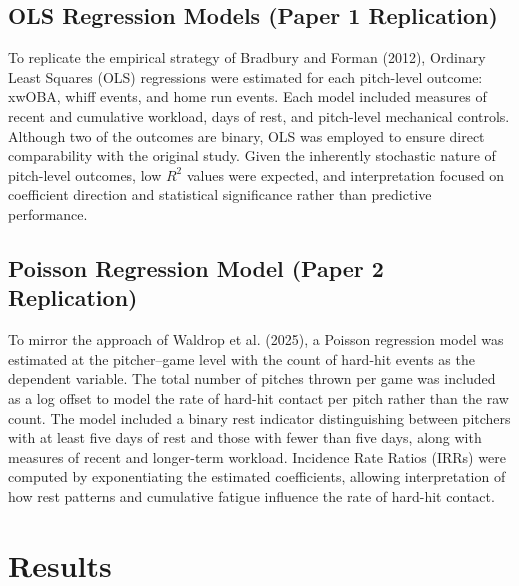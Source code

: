 \documentclass[12pt, letterpaper]{article}
\begin{document}
\subsection{OLS Regression Models (Paper 1 Replication)}

To replicate the empirical strategy of Bradbury and Forman (2012), Ordinary Least Squares (OLS) regressions were estimated for each pitch-level outcome: xwOBA, whiff events, and home run events. Each model included measures of recent and cumulative workload, days of rest, and pitch-level mechanical controls. Although two of the outcomes are binary, OLS was employed to ensure direct comparability with the original study. Given the inherently stochastic nature of pitch-level outcomes, low $R^2$ values were expected, and interpretation focused on coefficient direction and statistical significance rather than predictive performance.

\subsection{Poisson Regression Model (Paper 2 Replication)}

To mirror the approach of Waldrop et al. (2025), a Poisson regression model was estimated at the pitcher--game level with the count of hard-hit events as the dependent variable. The total number of pitches thrown per game was included as a log offset to model the rate of hard-hit contact per pitch rather than the raw count. The model included a binary rest indicator distinguishing between pitchers with at least five days of rest and those with fewer than five days, along with measures of recent and longer-term workload. Incidence Rate Ratios (IRRs) were computed by exponentiating the estimated coefficients, allowing interpretation of how rest patterns and cumulative fatigue influence the rate of hard-hit contact.



\section{Results}
\end{document}
